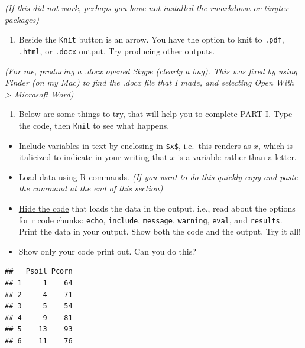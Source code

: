 \documentclass[
]{book}
\providecommand{\tightlist}{%
  \setlength{\itemsep}{0pt}\setlength{\parskip}{0pt}}
\begin{document}
\emph{(If this did not work, perhaps you have not installed the rmarkdown or tinytex packages)}

\begin{enumerate}
\def\labelenumi{\arabic{enumi}.}
\setcounter{enumi}{2}
\tightlist
\item
  Beside the \texttt{Knit} button is an arrow. You have the option to knit to \texttt{.pdf}, \texttt{.html}, or \texttt{.docx} output. Try producing other outputs.
\end{enumerate}

\emph{(For me, producing a .docx opened Skype (clearly a bug). This was fixed by using Finder (on my Mac) to find the .docx file that I made, and selecting Open With \textgreater{} Microsoft Word)}

\begin{enumerate}
\def\labelenumi{\arabic{enumi}.}
\setcounter{enumi}{3}
\tightlist
\item
  Below are some things to try, that will help you to complete PART I. Type the code, then \texttt{Knit} to see what happens.
\end{enumerate}

\begin{itemize}
\item
  Include variables in-text by enclosing in \texttt{\$x\$}, i.e.~this renders as \(x\), which is italicized to indicate in your writing that \(x\) is a variable rather than a letter.
\item
  \href{https://ahurford.github.io/quant-guide-all-courses/data-entry.html\#loading-or-importing-data}{Load data} using R commands. \emph{(If you want to do this quickly copy and paste the command at the end of this section)}
\item
  \href{https://bookdown.org/yihui/rmarkdown/r-code.html}{Hide the code} that loads the data in the output. i.e., read about the options for r code chunks: \texttt{echo}, \texttt{include}, \texttt{message}, \texttt{warning}, \texttt{eval}, and \texttt{results}. Print the data in your output. Show both the code and the output. Try it all!
\item
  Show only your code print out. Can you do this?
\end{itemize}

\begin{verbatim}
##   Psoil Pcorn
## 1     1    64
## 2     4    71
## 3     5    54
## 4     9    81
## 5    13    93
## 6    11    76
\end{verbatim}
\end{document}

